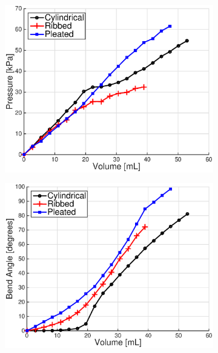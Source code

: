 \begin{figure}[htb]
        \centering
        \begin{subfigure}[b]{0.95\columnwidth}
            \centering
            \includegraphics[width=0.95\columnwidth]{figures/actuators/morphologiescharacterization/PressureVsVolumeColor.eps}
            \caption{}
            \label{fig:Characterization_PressureVsVolume}
        \end{subfigure}
        \begin{subfigure}[b]{0.95\columnwidth}
            \centering
            \includegraphics[width=0.95\columnwidth]{figures/actuators/morphologiescharacterization/BendAngleVsVolumeColor.eps}
            \caption{}

\end{subfigure}
\end{figure}
